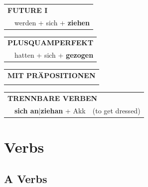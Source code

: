 \documentclass[10pt,a4paper]{revtex4-2}
\begin{document}
\begin{verbbox-acc}
\begin{tabular}{rl}
    \multicolumn{2}{l}{\textbf{FUTURE I} }\\
    &werden + sich + \textbf{ziehen}\\
 
  \end{tabular}
\hfill
   \begin{tabular}{rl}
      \multicolumn{2}{l}{\textbf{PLUSQUAMPERFEKT}}\\
    &hatten + sich + \textbf{gezogen}\\
  \end{tabular}
  
\vspace{10pt}

   \begin{tabular}{lll}
      \multicolumn{3}{l}{\textbf{MIT PRÄPOSITIONEN}}\\
\vspace{0pt}
  \end{tabular}
  \hfill
   \begin{tabular}{lll}
    \multicolumn{3}{l}{\textbf{TRENNBARE VERBEN}}\\
& \textbf{sich an$|$ziehan} + Akk & (to get dressed)
 \end{tabular}
  
  \vspace{-5pt}

\end{verbbox-acc}

\section{Verbs}

\subsection{A Verbs}
\end{document}
